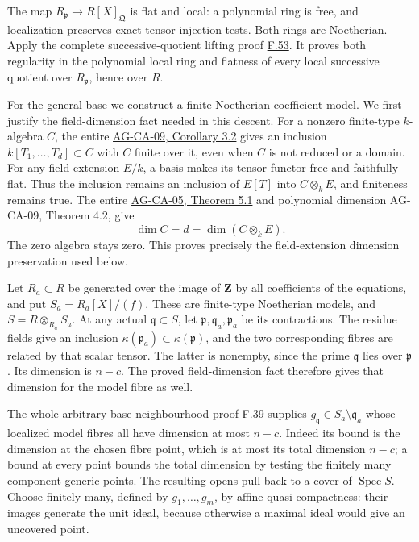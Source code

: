\documentclass[11pt,a4paper,openany]{report}
\newcounter{none}
\begin{document}
The map \(R_{\mathfrak p}\to R[X]_{\mathfrak Q}\) is flat and local: a polynomial ring is free, and localization preserves exact tensor injection tests. Both rings are Noetherian. Apply the complete successive-quotient lifting proof \hyperref[AG-RG-S05-algebra-lemma-grothendieck-regular-sequence]{F.53}. It proves both regularity in the polynomial local ring and flatness of every local successive quotient over \(R_{\mathfrak p}\), hence over \(R\).

For the general base we construct a finite Noetherian coefficient model. We first justify the field-dimension fact needed in this descent. For a nonzero finite-type \(k\)-algebra \(C\), the entire \href{https://github.com/KokunoYumeto/open-math-courses/blob/d02d0a3669f42579db037cd44de1d113fdd770a1/docs/courses/AG-CA/src/krull-dimension-and-noether-normalization.md}{AG-CA-09, Corollary 3.2} gives an inclusion \(k[T_1,\ldots,T_d]\subset C\) with \(C\) finite over it, even when \(C\) is not reduced or a domain. For any field extension \(E/k\), a basis makes its tensor functor free and faithfully flat. Thus the inclusion remains an inclusion of \(E[T]\) into \(C\otimes_kE\), and finiteness remains true. The entire \href{https://github.com/KokunoYumeto/open-math-courses/blob/d02d0a3669f42579db037cd44de1d113fdd770a1/docs/courses/AG-CA/src/integral-extensions-lying-over-going-up-and-going-down.md}{AG-CA-05, Theorem 5.1} and polynomial dimension AG-CA-09, Theorem 4.2, give \[\dim C=d=\dim(C\otimes_kE).\] The zero algebra stays zero. This proves precisely the field-extension dimension preservation used below.

Let \(R_a\subset R\) be generated over the image of \(\mathbf Z\) by all coefficients of the equations, and put \(S_a=R_a[X]/(f)\). These are finite-type Noetherian models, and \(S=R\otimes_{R_a}S_a\). At any actual \(\mathfrak q\subset S\), let \(\mathfrak p,\mathfrak q_a,\mathfrak p_a\) be its contractions. The residue fields give an inclusion \(\kappa(\mathfrak p_a)\subset\kappa(\mathfrak p)\), and the two corresponding fibres are related by that scalar tensor. The latter is nonempty, since the prime \(\mathfrak q\) lies over \(\mathfrak p\). Its dimension is \(n-c\). The proved field-dimension fact therefore gives that dimension for the model fibre as well.

The whole arbitrary-base neighbourhood proof \hyperref[AG-RG-S05-algebra-lemma-dimension-fibres-bounded-open-upstairs]{F.39} supplies \(g_{\mathfrak q}\in S_a\setminus\mathfrak q_a\) whose localized model fibres all have dimension at most \(n-c\). Indeed its bound is the dimension at the chosen fibre point, which is at most its total dimension \(n-c\); a bound at every point bounds the total dimension by testing the finitely many component generic points. The resulting opens pull back to a cover of \(\operatorname{Spec}S\). Choose finitely many, defined by \(g_1,\ldots,g_m\), by affine quasi-compactness: their images generate the unit ideal, because otherwise a maximal ideal would give an uncovered point.
\end{document}
